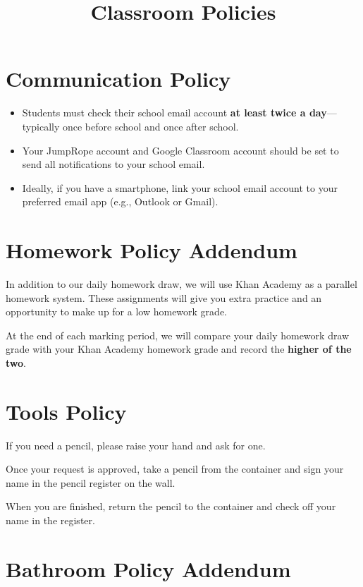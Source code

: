 \documentclass[10pt]{article}
\title{\textbf{Classroom Policies}}
\date{}
\begin{document}
\maketitle

\section{Communication Policy}

\begin{itemize}
    \item Students must check their school email account \textbf{at least twice a day}---typically once before school and once after school.
    \item Your JumpRope account and Google Classroom account should be set to send all notifications to your school email.
    \item Ideally, if you have a smartphone, link your school email account to your preferred email app (e.g., Outlook or Gmail).
\end{itemize}

\section{Homework Policy Addendum}

In addition to our daily homework draw, we will use Khan Academy as a parallel homework system. These assignments will give you extra practice and an opportunity to make up for a low homework grade.

At the end of each marking period, we will compare your daily homework draw grade with your Khan Academy homework grade and record the \textbf{higher of the two}.

\section{Tools Policy}

If you need a pencil, please raise your hand and ask for one.

Once your request is approved, take a pencil from the container and sign your name in the pencil register on the wall.

When you are finished, return the pencil to the container and check off your name in the register.

\section{Bathroom Policy Addendum}
\end{document}
